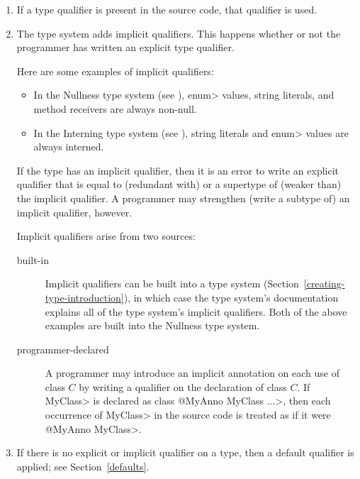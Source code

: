 \begin{enumerate}
\item
  If a type qualifier is present in the source code, that qualifier is used.

\item
  The type system adds implicit qualifiers.  This happens whether or not
  the programmer has written an explicit type qualifier.

  Here are some examples of implicit qualifiers:

\begin{itemize}
\item
  In the Nullness type system (see ),
  \<enum> values, string literals, and method receivers are always non-null.
\item
  In the Interning type system (see ),
  string literals and \<enum> values are always interned.
\end{itemize}

  If the type has an implicit qualifier, then it is an error to write an
  explicit qualifier that is equal to (redundant with) or a supertype of
  (weaker than) the implicit qualifier.  A programmer may strengthen
  (write a subtype of) an implicit qualifier, however.

  Implicit qualifiers arise from two sources:
\begin{description}
\item[built-in]
  Implicit qualifiers can be
  built into a type system (Section~\ref{creating-type-introduction}), in
  which case the type system's documentation explains all of the type
  system's implicit qualifiers.  Both of the above examples are built into
  the Nullness type system.
\item[programmer-declared]
  A programmer may introduce an implicit annotation on each use of class
  $C$ by writing a qualifier on the declaration of class $C$.  If \<MyClass>
  is declared as \<class @MyAnno MyClass \ttlcb...\ttrcb>, then each occurrence of
  \<MyClass> in the source code is treated as if it were \<@MyAnno
  MyClass>.
\end{description}



\item
  If there is no explicit or implicit qualifier on a type, then a default
  qualifier
  is applied; see Section~\ref{defaults}.


\end{enumerate}

